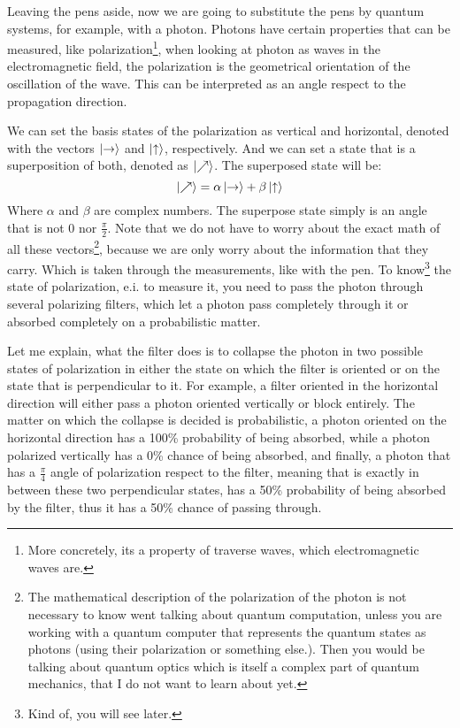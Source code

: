 Leaving the pens aside, now we are going to substitute the pens by quantum systems, for example, with a photon. Photons have certain properties that can be measured, like polarization\footnote{More concretely, its a property of traverse waves, which electromagnetic waves are.}, when looking at photon as waves in the electromagnetic field, the polarization is the geometrical orientation of the oscillation of the wave. This can be interpreted as an angle respect to the propagation direction. 

We can set the basis states of the polarization as vertical and horizontal, denoted with the vectors $\ket{\text{\textrightarrow}}$ and $\ket{\text{\textuparrow}}$, respectively. And we can set a state that is a superposition of both, denoted as $\ket{\nearrow}$. 
The superposed state will be: 
$$
\ket{\nearrow} = \alpha\ket{\text{\textrightarrow}} + \beta\ket{\text{\textuparrow}}
$$
Where $\alpha$ and $\beta$ are complex numbers.
The superpose state simply is an angle that is not $0$ nor $\frac{\pi}{2}$. Note that we do not have to worry about the exact math of all these vectors\footnote{The mathematical description of the polarization of the photon is not necessary to know went talking about quantum computation, unless you are working with a quantum computer that represents the quantum states as photons (using their polarization or something else.). Then you would be talking about quantum optics which is itself a complex part of quantum mechanics, that I do not want to learn about yet.}, because we are only worry about the information that they carry. Which is taken through the measurements, like with the pen. To know\footnote{Kind of, you will see later.} the state of polarization, e.i. to measure it, you need to pass the photon through several polarizing filters, which let a photon pass completely through it or absorbed completely on a probabilistic matter. 

Let me explain, what the filter does is to collapse the photon in two possible states of polarization in either the state on which the filter is oriented or on the state that is perpendicular to it. For example, a filter oriented in the horizontal direction will either pass a photon oriented vertically or block entirely.  The matter on which the collapse is decided is probabilistic, a photon oriented on the horizontal direction has a 100\% probability of being absorbed, while a photon polarized vertically has a 0\% chance of being absorbed, and finally, a photon that has a $\frac{\pi}{4}$ angle of polarization respect to the filter, meaning that is exactly in between these two perpendicular states, has a 50\% probability of being absorbed by the filter, thus it has a 50\% chance of passing through. 

